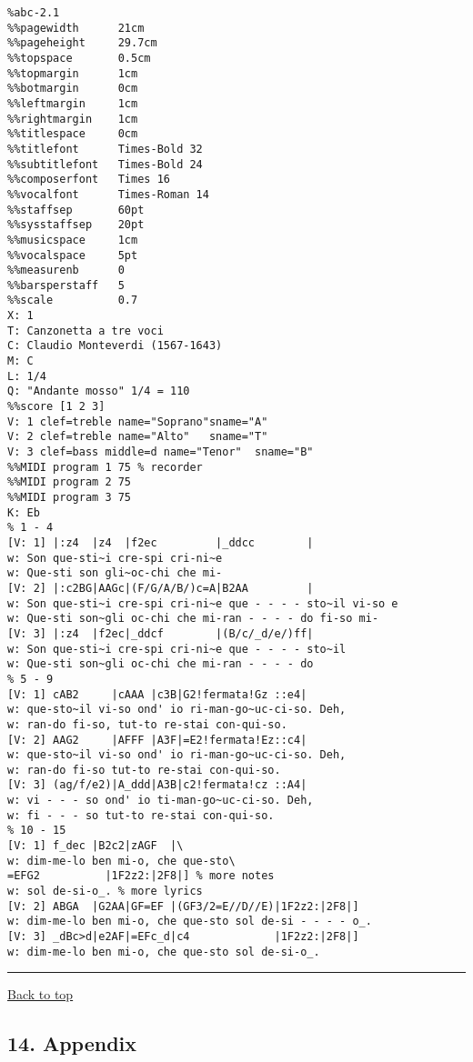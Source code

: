 \begin{verbatim}
%abc-2.1
%%pagewidth      21cm
%%pageheight     29.7cm
%%topspace       0.5cm
%%topmargin      1cm
%%botmargin      0cm
%%leftmargin     1cm
%%rightmargin    1cm
%%titlespace     0cm
%%titlefont      Times-Bold 32
%%subtitlefont   Times-Bold 24
%%composerfont   Times 16
%%vocalfont      Times-Roman 14
%%staffsep       60pt
%%sysstaffsep    20pt
%%musicspace     1cm
%%vocalspace     5pt
%%measurenb      0
%%barsperstaff   5
%%scale          0.7
X: 1
T: Canzonetta a tre voci
C: Claudio Monteverdi (1567-1643)
M: C
L: 1/4
Q: "Andante mosso" 1/4 = 110
%%score [1 2 3]
V: 1 clef=treble name="Soprano"sname="A"
V: 2 clef=treble name="Alto"   sname="T"
V: 3 clef=bass middle=d name="Tenor"  sname="B"
%%MIDI program 1 75 % recorder
%%MIDI program 2 75
%%MIDI program 3 75
K: Eb
% 1 - 4
[V: 1] |:z4  |z4  |f2ec         |_ddcc        |
w: Son que-sti~i cre-spi cri-ni~e
w: Que-sti son gli~oc-chi che mi-
[V: 2] |:c2BG|AAGc|(F/G/A/B/)c=A|B2AA         |
w: Son que-sti~i cre-spi cri-ni~e que - - - - sto~il vi-so e
w: Que-sti son~gli oc-chi che mi-ran - - - - do fi-so mi-
[V: 3] |:z4  |f2ec|_ddcf        |(B/c/_d/e/)ff|
w: Son que-sti~i cre-spi cri-ni~e que - - - - sto~il
w: Que-sti son~gli oc-chi che mi-ran - - - - do
% 5 - 9
[V: 1] cAB2     |cAAA |c3B|G2!fermata!Gz ::e4|
w: que-sto~il vi-so ond' io ri-man-go~uc-ci-so. Deh,
w: ran-do fi-so, tut-to re-stai con-qui-so.
[V: 2] AAG2     |AFFF |A3F|=E2!fermata!Ez::c4|
w: que-sto~il vi-so ond' io ri-man-go~uc-ci-so. Deh,
w: ran-do fi-so tut-to re-stai con-qui-so.
[V: 3] (ag/f/e2)|A_ddd|A3B|c2!fermata!cz ::A4|
w: vi - - - so ond' io ti-man-go~uc-ci-so. Deh,
w: fi - - - so tut-to re-stai con-qui-so.
% 10 - 15
[V: 1] f_dec |B2c2|zAGF  |\
w: dim-me-lo ben mi-o, che que-sto\
=EFG2          |1F2z2:|2F8|] % more notes
w: sol de-si-o_. % more lyrics
[V: 2] ABGA  |G2AA|GF=EF |(GF3/2=E//D//E)|1F2z2:|2F8|]
w: dim-me-lo ben mi-o, che que-sto sol de-si - - - - o_.
[V: 3] _dBc>d|e2AF|=EFc_d|c4             |1F2z2:|2F8|]
w: dim-me-lo ben mi-o, che que-sto sol de-si-o_.
\end{verbatim}

\begin{center}\rule{0.5\linewidth}{\linethickness}\end{center}

\protect\hyperlink{}{Back to top}

\hypertarget{appendix}{\subsection{14. Appendix}\label{appendix}}

